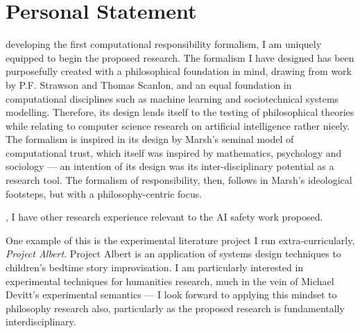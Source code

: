 \newpage

\section{Personal Statement}

 developing the first computational responsibility formalism, I am uniquely equipped to begin the proposed research. The formalism I have designed has been purposefully created with a philosophical foundation in mind, drawing from work by P.F. Strawson\cite{freedomandresentment} and Thomas Scanlon\cite{scanlon2006justice}, and an equal foundation in computational disciplines such as machine learning and sociotechnical systems modelling\cite{sommerville_resp_depend}. Therefore, its design lends itself to the testing of philosophical theories while relating to computer science research on artificial intelligence rather nicely. The formalism is inspired in its design by Marsh's seminal model of computational trust\cite{marsh1994}, which itself was inspired by mathematics, psychology and sociology --- an intention of its design was its inter-disciplinary potential as a research tool. The formalism of responsibility, then, follows in Marsh's ideological footsteps, but with a philosophy-centric focus.\par

, I have other research experience relevant to the AI safety work proposed.\par
One example of this is the experimental literature project I run extra-curricularly, \emph{Project Albert}. Project Albert is an application of systems design techniques to children's bedtime story improvisation. I am particularly interested in experimental techniques for humanities research, much in the vein of Michael Devitt's experimental semantics --- I look forward to applying this mindset to philosophy research also, particularly as the proposed research is fundamentally interdisciplinary.\par

